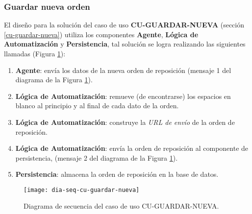 \subsubsection{Guardar nueva orden}
El diseño para la solución del caso de uso \textbf{CU-GUARDAR-NUEVA} (sección \ref{cu-guardar-nueva}) utiliza los componentes \textbf{Agente}, \textbf{Lógica de Automatización} y \textbf{Persistencia}, tal solución se logra realizando las siguientes llamadas (Figura \ref{fig:dia-seq-cu-guardar-nueva}):
\begin{enumerate}
	\item \textbf{Agente}: envía los datos de la nueva orden de reposición (mensaje 1 del diagrama de la Figura \ref{fig:dia-seq-cu-guardar-nueva}).
	\item \textbf{Lógica de Automatización}: remueve (de encontrarse) los espacios en blanco al principio y al final de cada dato de la orden.
	\item \textbf{Lógica de Automatización}: construye la \textit{URL de envío} de la orden de reposición.
	\item \textbf{Lógica de Automatización}: envía la orden de reposición al componente de persistencia, (mensaje 2 del diagrama de la Figura \ref{fig:dia-seq-cu-guardar-nueva}).
	\item \textbf{Persistencia}: almacena la orden de reposición en la base de datos.
\end{enumerate}

\begin{figure}[h]
	\centering
	\texttt{[image: dia-seq-cu-guardar-nueva]}
	\caption{Diagrama de secuencia del caso de uso CU-GUARDAR-NUEVA.}
	\label{fig:dia-seq-cu-guardar-nueva}
\end{figure}

